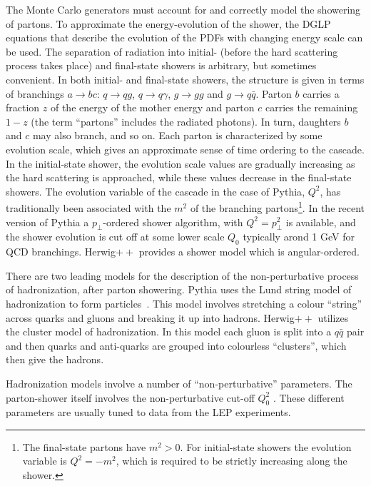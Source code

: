 The Monte Carlo generators must account for and correctly model the showering of partons. To approximate the energy-evolution of the shower, the DGLP equations that describe the evolution of the PDFs with changing energy scale can be used. The separation of radiation into initial- (before the hard scattering process takes place) and final-state showers is arbitrary, but sometimes convenient.  In both initial- and final-state showers, the structure is given in terms of branchings $a \rightarrow bc$: $q \rightarrow qg$, $q \rightarrow q\gamma$, $g \rightarrow gg$ and $g \rightarrow q\bar{q}$. Parton $b$ carries a fraction $z$ of the energy of the mother energy and parton $c$ carries the remaining $1-z$ (the term ``partons'' includes the radiated photons).  In turn, daughters $b$ and $c$ may also branch, and so on. Each parton is characterized by some evolution scale, which gives an approximate sense of time ordering to the cascade. In the initial-state shower,  the evolution scale values are gradually increasing as the hard scattering is approached, while  these values decrease in the final-state showers. The evolution variable of the cascade in the case of {\sc Pythia}, $Q^2$, has traditionally been associated with the $m^2$ of the branching partons\footnote{The final-state partons have $m^2>0$. For initial-state showers the evolution variable is $Q^2=-m^2$, which is required to be strictly increasing along the shower.}. In the recent version of {\sc Pythia} a $p_{\perp}$-ordered shower algorithm, with $Q^2=p_{\perp}^2$ is available, and the shower evolution is cut off at some lower scale  $Q_0$ typically arond 1 GeV for QCD branchings. {\sc Herwig}$++$ provides a shower model which is angular-ordered.

There are two leading models for the description of the non-perturbative process of hadronization, after parton showering. {\sc Pythia} uses the Lund string model of hadronization to form particles~\cite{LUNDMODEL}.  This model involves stretching a colour ``string'' across quarks and gluons and breaking it up into hadrons. %
{\sc Herwig}$++$ utilizes the cluster model of hadronization. In this model each gluon is split into a $q\bar{q}$ pair and then quarks and anti-quarks are grouped into colourless ``clusters'', which then give the hadrons.

Hadronization models involve a number of ``non-perturbative'' parameters. The parton-shower itself involves the non-perturbative cut-off $Q^2_0$ . These different parameters are usually tuned to data from the LEP experiments.


